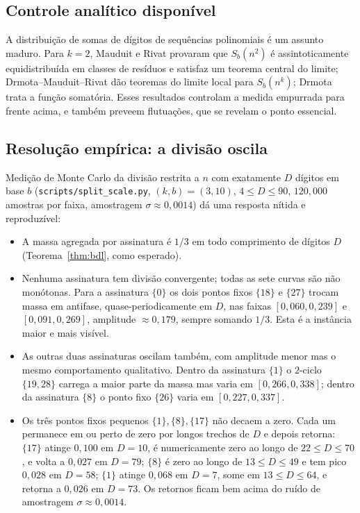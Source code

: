 \documentclass[11pt]{article}
\theoremstyle{definition}
\theoremstyle{remark}
\begin{document}
\subsection{Controle analítico disponível}

A distribuição de somas de dígitos de sequências polinomiais é um assunto maduro. Para $k=2$, Mauduit e Rivat \cite{mauduit-rivat} provaram que $S_b(n^2)$ é assintoticamente equidistribuída em classes de resíduos e satisfaz um teorema central do limite; Drmota--Mauduit--Rivat \cite{dmr} dão teoremas do limite local para $S_b(n^k)$; Drmota \cite{drmota-poly} trata a função somatória. Esses resultados controlam a medida empurrada para frente acima, e também preveem flutuações, que se revelam o ponto essencial.

\subsection{Resolução empírica: a divisão oscila}

Medição de Monte Carlo da divisão restrita a $n$ com exatamente $D$ dígitos em base $b$ (\texttt{scripts/split\_scale.py}, $(k,b) = (3,10)$, $4 \le D \le 90$, $120{,}000$ amostras por faixa, amostragem $\sigma \approx 0{,}0014$) dá uma resposta nítida e reproduzível:
\begin{itemize}
\item A massa agregada por assinatura é $1/3$ em todo comprimento de dígitos $D$ (Teorema~\ref{thm:bdl}, como esperado).
\item Nenhuma assinatura tem divisão convergente; todas as sete curvas são não monótonas. Para a assinatura $\{0\}$ os dois pontos fixos $\{18\}$ e $\{27\}$ trocam massa em antifase, quase-periodicamente em $D$, nas faixas $[0{,}060,0{,}239]$ e $[0{,}091,0{,}269]$, amplitude $\approx 0{,}179$, sempre somando $1/3$. Esta é a instância maior e mais visível.
\item As outras duas assinaturas oscilam também, com amplitude menor mas o mesmo comportamento qualitativo. Dentro da assinatura $\{1\}$ o $2$-ciclo $\{19,28\}$ carrega a maior parte da massa mas varia em $[0{,}266,0{,}338]$; dentro da assinatura $\{8\}$ o ponto fixo $\{26\}$ varia em $[0{,}227,0{,}337]$.
\item Os três pontos fixos pequenos $\{1\},\{8\},\{17\}$ não decaem a zero. Cada um permanece em ou perto de zero por longos trechos de $D$ e depois retorna: $\{17\}$ atinge $0{,}100$ em $D = 10$, é numericamente zero ao longo de $22 \le D \le 70$, e volta a $0{,}027$ em $D = 79$; $\{8\}$ é zero ao longo de $13 \le D \le 49$ e tem pico $0{,}028$ em $D = 58$; $\{1\}$ atinge $0{,}068$ em $D = 7$, some em $13 \le D \le 64$, e retorna a $0{,}026$ em $D = 73$. Os retornos ficam bem acima do ruído de amostragem $\sigma \approx 0{,}0014$.
\end{itemize}
\end{document}
